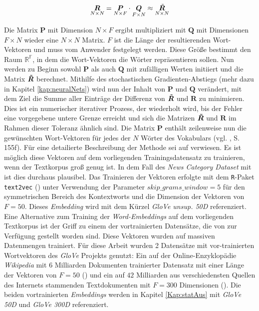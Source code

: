 \documentclass[a4paper,11pt]{article}
\begin{document}
\begin{equation*}
\underset{N \times N}{\bm{R}} = \underset{N \times F}{\bm{P}} \cdot \underset{F \times N}{\bm{Q}} \approx  \underset{N \times N}{\Tilde{\bm{R}}} 
\end{equation*}

Die Matrix $\bm{P}$ mit Dimension $N \times F$ ergibt multipliziert mit $\bm{Q}$ mit Dimensionen $F \times N$ wieder eine $N \times N$ Matrix. $F$ ist die Länge der resultierenden Wort-Vektoren und muss vom Anwender festgelegt werden. Diese Größe bestimmt den Raum $\mathbb{R^F}$, in dem die Wort-Vektoren die Wörter repräsentieren sollen. Nun werden zu Beginn sowohl $\bm{P}$ als auch $\bm{Q}$ mit zufälligen Werten initiiert und die Matrix $\bm{\Tilde{R}}$ berechnet. Mithilfe des stochastischen Gradienten-Abstiegs (mehr dazu in Kapitel \ref{kap:neuralNets}) wird nun der Inhalt von $\bm{P}$ und $\bm{Q}$ verändert, mit dem Ziel die Summe aller Einträge der Differenz von $\bm{\Tilde{R}}$ und $\bm{R}$ zu minimieren. Dies ist ein numerischer iterativer Prozess, der wiederholt wird, bis der Fehler eine vorgegebene untere Grenze erreicht und sich die Matrizen $\bm{\Tilde{R}}$ und $\bm{R}$ im Rahmen dieser Toleranz ähnlich sind. Die Matrix $\bm{P}$ enthält zeilenweise nun die gewünschten Wort-Vektoren für jedes der $N$ Wörter des Vokabulars (vgl. \cite{keras}, S. 155f). Für eine detailierte Beschreibung der Methode sei auf \cite{glovePaper} verwiesen. 
Es ist möglich diese Vektoren auf dem vorliegenden Trainingsdatensatz zu trainieren, wenn der Textkorpus groß genug ist. In dem Fall des \textit{News Category Dataset} mit  ist dies durchaus plausibel. Das Trainieren der Vektoren erfolgte mit dem \texttt{R}-Paket \texttt{text2vec} (\cite{text2vec}) unter Verwendung der Parameter $skip\_grams\_window = 5$ für den symmetrischen Bereich des Kontextworts und die Dimension der Vektoren von $F = 50$. Dieses \textit{Embedding} wird mit dem Kürzel \textit{GloVe unsup. 50D} referenziert. \\
Eine Alternative zum Training der \textit{Word-Embeddings} auf dem vorliegenden Textkorpus ist der Griff zu einem der vortrainierten Datensätze, die von \cite{gloveOnline}
zur Verfügung gestellt worden sind. Diese Vektoren wurden auf massiven Datenmengen trainiert. Für diese Arbeit wurden 2 Datensätze mit vor-trainierten Wortvektoren des \textit{GloVe} Projekts genutzt: Ein auf der Online-Enzyklopädie \textit{Wikipedia} mit $6$ Milliarden Dokumenten trainierter Datensatz mit einer Länge der Vektoren von $F = 50$ (\cite{gloveWiki}) und ein auf $42$ Milliarden aus verschiedensten Quellen des Internets stammenden Textdokumenten mit $F = 300$ Dimensionen (\cite{gloveCommon}). Die beiden vortrainierten \textit{Embeddings} werden in Kapitel \ref{Kap:statAus} mit \textit{GloVe 50D} und \textit{GloVe 300D} referenziert.\\
\end{document}
